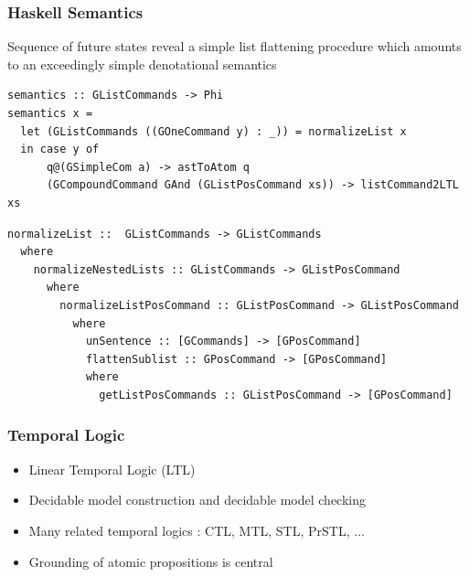 \documentclass{beamer}
\begin{document}
\begin{frame}[fragile]
\frametitle{Haskell Semantics}
\fontsize{9pt}{10pt}\selectfont
\begin{block}{}
Sequence of future states reveal a simple list flattening procedure which
amounts to an exceedingly simple denotational semantics
\end{block}
\pause
\begin{verbatim}
semantics :: GListCommands -> Phi
semantics x =
  let (GListCommands ((GOneCommand y) : _)) = normalizeList x
  in case y of
      q@(GSimpleCom a) -> astToAtom q
      (GCompoundCommand GAnd (GListPosCommand xs)) -> listCommand2LTL xs
\end{verbatim}
\pause
\begin{verbatim}
normalizeList ::  GListCommands -> GListCommands
  where
    normalizeNestedLists :: GListCommands -> GListPosCommand
      where
        normalizeListPosCommand :: GListPosCommand -> GListPosCommand
          where
            unSentence :: [GCommands] -> [GPosCommand]
            flattenSublist :: GPosCommand -> [GPosCommand]
            where
              getListPosCommands :: GListPosCommand -> [GPosCommand]
\end{verbatim}
\end{frame}





\begin{frame}
\frametitle{Temporal Logic}
\begin{itemize}[<+->]
\item Linear Temporal Logic (LTL)
\item Decidable model construction and decidable model checking
\item Many related temporal logics : CTL, MTL, STL, PrSTL, ...
\item Grounding of atomic propositions is central
\end{itemize}
\end{frame}
\end{document}
